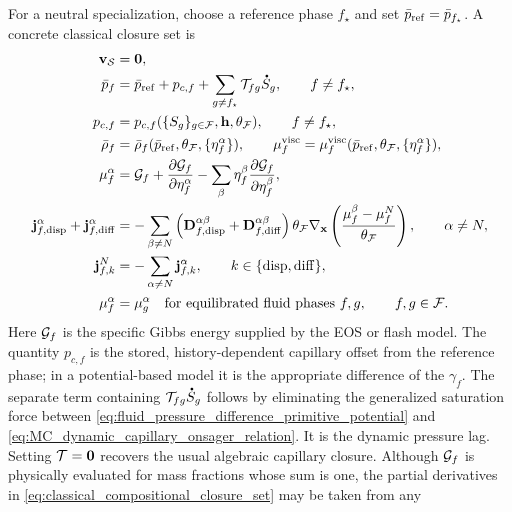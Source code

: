 For a neutral specialization, choose a reference phase \(f_\star\) and set
\(\bar p_{\rm ref}=\bar p_{f_\star}\).  A concrete classical closure set is
%
\begin{equation}
	\begin{aligned}
		\mbf v_{\mc S} &= \mbf 0, \\
		\bar p_f
		&=
		\bar p_{\rm ref}+p_{c,f}
		+
		\sum_{g\ne f_\star}\mc T_{fg}\phasedot S_g,
		\qquad f\ne f_\star, \\
		p_{c,f}
		&=
		p_{c,f}(\{S_g\}_{g\in\mc F},\mbf h,\theta_{\mc F}),
		\qquad f\ne f_\star, \\
		\bar\rho_f &= \bar\rho_f(\bar p_{\rm ref},\theta_{\mc F},\{\eta_f^\alpha\}), \qquad
			\mu_f^{\mathrm{visc}}
			=
			\mu_f^{\mathrm{visc}}(\bar p_{\rm ref},\theta_{\mc F},\{\eta_f^\alpha\}), \\
		\mu_f^\alpha
		&=
		\mc G_f
		+
		\frac{\partial \mc G_f}{\partial\eta_f^\alpha}
		-
		\sum_\beta
		\eta_f^\beta
		\frac{\partial \mc G_f}{\partial\eta_f^\beta},
		\\
			\mbf j_{f,{\rm disp}}^\alpha+\mbf j_{f,{\rm diff}}^\alpha
			&=
			-\sum_{\beta\ne N}
		\left(
		\mbf D_{f,{\rm disp}}^{\alpha\beta}
		+
			\mbf D_{f,{\rm diff}}^{\alpha\beta}
			\right)
			\theta_{\mc F}
			\nabla_{\mbf x}
			\left(
			\frac{\mu_f^\beta-\mu_f^N}{\theta_{\mc F}}
			\right),
		\qquad \alpha\ne N,
		\\
		\mbf j_{f,k}^N
		&=
		-\sum_{\alpha\ne N}
		\mbf j_{f,k}^\alpha,
		\qquad
		k\in\{{\rm disp},{\rm diff}\},
		\\
		\mu_f^\alpha &= \mu_g^\alpha
		\quad \text{for equilibrated fluid phases } f,g,
		\qquad
		f,g\in\mc F .
	\end{aligned}
	\label{eq:classical_compositional_closure_set}
\end{equation}
%
Here \(\mathcal{G}_f\) is the specific Gibbs energy supplied by the EOS or flash
model.  The quantity \(p_{c,f}\) is the stored, history-dependent capillary
offset from the reference phase; in a potential-based model it is the
appropriate difference of the \(\gamma_f\).  The separate term containing
\(\mc T_{fg}\phasedot S_g\) follows by eliminating the generalized saturation force
between \eqref{eq:fluid_pressure_difference_primitive_potential} and
\eqref{eq:MC_dynamic_capillary_onsager_relation}.  It is the dynamic pressure
lag.  Setting \(\mathcal{T}=\mathbf{0}\)
recovers the usual algebraic capillary closure.
Although \(\mathcal{G}_f\) is physically evaluated for mass fractions whose sum is one,
the partial derivatives in
\eqref{eq:classical_compositional_closure_set} may be taken from any
